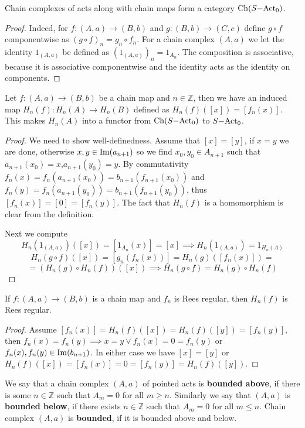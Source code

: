 \begin{proposition}
    Chain complexes of acts along with chain maps form a category $\mathrm{Ch}(S\mathrm{-Act}_0)$.
\end{proposition}
\begin{proof}
    Indeed, for $f:(A,a)\to (B,b)$ and $g:(B,b)\to (C,c)$ define $g\circ f$ componentwise as 
    $(g\circ f)_n = g_n \circ f_n$. For a chain complex $(A,a)$ we let the identity $1_{(A,a)}$ 
    be defined as $(1_{(A,a)})_n = 1_{A_n}$. The composition is associative, because it is associative 
    componentwise and the identity acts as the identity on components.
\end{proof}
\begin{proposition}
    Let $f: (A,a) \to (B,b)$ be a chain map and $n\in\mathbb{Z}$, then we have an induced map $H_n(f) : H_n(A) \to H_n(B)$
    defined as $H_n(f)([x]) = [f_n(x)]$. This makes $H_n(A)$ into a functor from $\mathrm{Ch}(S\mathrm{-Act}_0)$ to $S\mathrm{-Act}_0$.
\end{proposition}
\begin{proof}[Proof]
    We need to show well-definedness. Assume that $[x]=[y]$, if $x=y$ we are done, otherwise $x,y\in\mathrm{Im}(a_{n+1})$ so we 
    find $x_0,y_0\in A_{n+1}$ such that $a_{n+1}(x_0) = x$,$a_{n+1}(y_0)=y$. By commutativity $f_n(x)=f_n(a_{n+1}(x_0))=b_{n+1}(f_{n+1}(x_0))$
    and $f_n(y) = f_n(a_{n+1}(y_0))=b_{n+1}(f_{n+1}(y_0))$, thus $[f_n(x)]=[0]=[f_n(y)]$. The fact that $H_n(f)$ is a homomorphism 
    is clear from the definition.\par 
    Next we compute
    \[
        H_n(1_{(A,a)})([x]) = [1_{A_n}(x)] = [x] \implies H_n(1_{(A,a)}) = 1_{H_n(A)}
    \]
    \[
        H_n(g\circ f)([x]) = [g_n(f_n(x))] = H_n(g)([f_n(x)]) =
    \]
    \[
         =(H_n(g)\circ H_n(f))([x]) \implies H_n(g\circ f) = H_n(g)\circ H_n(f)
    \]
\end{proof}
\begin{lemma}
    If $f: (A,a)\to (B,b)$ is a chain map and $f_n$ is Rees regular, then $H_n(f)$ is Rees regular.
\end{lemma}
\begin{proof}[Proof]
    Assume $[f_n(x)]=H_n(f)([x])=H_n(f)([y])=[f_n(y)]$, then $f_n(x)=f_n(y) \implies x=y \lor f_n(x)=0=f_n(y)$ or 
    $f_n(x),f_n(y)\in\mathrm{Im}(b_{n+1})$. In either case we have $[x]=[y]$ or $H_n(f)([x])=[f_n(x)]=0=[f_n(y)]=H_n(f)([y])$.
\end{proof}
\begin{definition}
    We say that a chain complex $(A,a)$ of pointed acts is \textbf{bounded above}, if there is some $n\in\mathbb{Z}$ such that 
    $A_m=0$ for all $m\geq n$. Similarly we say that $(A,a)$ is \textbf{bounded below}, if there exists $n\in\mathbb{Z}$ such that 
    $A_m=0$ for all $m\leq n$. Chain complex $(A,a)$ is \textbf{bounded}, if it is bounded above and below.
\end{definition}
